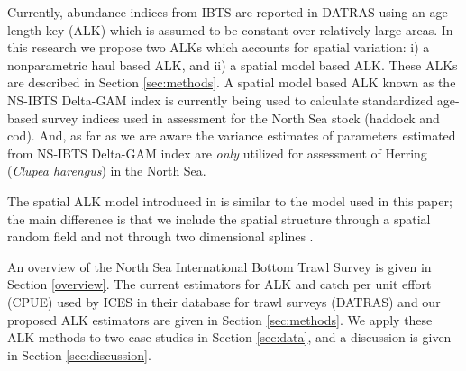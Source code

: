 \documentclass[a4paper 12pt]{article}
\numberwithin{equation}{section}
\begin{document}
Currently, abundance indices from IBTS are reported in DATRAS \citep{datras} using an age-length key (ALK) \citep{fridriksson1934calculation} which is assumed to be constant over relatively large areas. In this research we propose two ALKs which accounts for spatial variation: i) a nonparametric  haul based ALK, and ii) a spatial model based ALK. These ALKs are described in Section \ref{sec:methods}. %
A spatial model based ALK \citep{berg2012spatial, berg2014evaluation} known as the NS-IBTS Delta-GAM index \citep{ICES2016b} is currently being used to calculate standardized age-based survey indices used in assessment for the North Sea stock (haddock and cod). And, as far as we are aware the variance estimates of parameters estimated from NS-IBTS Delta-GAM index  are \textit{only} utilized for assessment of Herring (\textit{Clupea harengus}) in the North Sea.

The spatial ALK model introduced in \citet{berg2012spatial} is similar to the model used in this paper; the main difference is that we include the spatial structure through a spatial random field \citep{lindgren2011explicit} and not through two dimensional splines \citep{wood2017generalized}.

 An  overview of the  North Sea International Bottom Trawl Survey is given in Section \ref{overview}. The current estimators for ALK and catch per unit effort (CPUE) used by ICES in their database for trawl surveys (DATRAS) and our proposed ALK estimators are given in Section \ref{sec:methods}. We apply these ALK methods to two case studies in Section  \ref{sec:data}, and a discussion is given in Section \ref{sec:discussion}.
\end{document}
